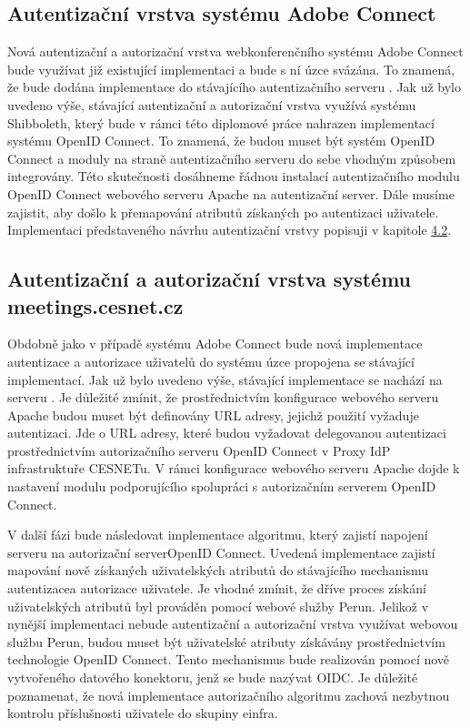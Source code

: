 \documentclass[
  printed, %
  twoside, %
  table,   %
  nolof,     %
  nolot,     %
]{fithesis3}
\begin{document}
\subsection{Autentizační vrstva systému Adobe Connect}
Nová autentizační a autorizační vrstva webkonferenčního systému Adobe Connect bude využívat již existující implementaci a bude s ní úzce svázána. To znamená, že bude dodána implementace do stávajícího autentizačního serveru . Jak už bylo uvedeno výše, stávající autentizační a autorizační vrstva využívá systému Shibboleth, který bude v rámci této diplomové práce nahrazen implementací systému OpenID Connect. To znamená, že budou muset být systém OpenID Connect a moduly na straně autentizačního serveru  do sebe vhodným způsobem integrovány. Této skutečnosti dosáhneme řádnou instalací autentizačního modulu OpenID Connect webového serveru Apache na autentizační server. Dále musíme zajistit, aby došlo k přemapování atributů získaných po autentizaci uživatele. Implementaci představeného návrhu autentizační vrstvy popisuji v kapitole \hyperref[ACImpl]{4.2}. 

\subsection{Autentizační a autorizační vrstva systému meetings.cesnet.cz}
\label{shong-proposal}
Obdobně jako v případě systému Adobe Connect bude nová implementace autentizace a autorizace uživatelů do systému  úzce propojena se stávající implementací. Jak už bylo uvedeno výše, stávající implementace se nachází na serveru . Je důležité zmínit, že prostřednictvím konfigurace webového serveru Apache budou muset být definovány URL adresy, jejichž použití vyžaduje autentizaci. Jde o URL adresy, které budou vyžadovat delegovanou autentizaci prostřednictvím autorizačního serveru OpenID Connect v Proxy IdP infrastruktuře CESNETu. V rámci konfigurace webového serveru Apache dojde k nastavení modulu podporujícího spolupráci s autorizačním serverem OpenID Connect.  \par

V další fázi bude následovat implementace algoritmu, který zajistí napojení serveru  na autorizační server\break OpenID Connect. Uvedená implementace zajistí mapování nově získaných uživatelských atributů do stávajícího mechanismu autentizace\break a autorizace uživatele. Je vhodné zmínit, že dříve proces získání uživatelských atributů byl prováděn pomocí webové služby Perun. Jelikož v nynější implementaci nebude autentizační a autorizační vrstva využívat webovou službu Perun, budou muset být uživatelské atributy získávány prostřednictvím technologie OpenID Connect. Tento mechanismus bude realizován pomocí nově vytvořeného datového konektoru, jenž se bude nazývat OIDC. Je důležité poznamenat, že nová implementace autorizačního algoritmu zachová nezbytnou kontrolu příslušnosti uživatele do skupiny einfra. 
\par
\end{document}

